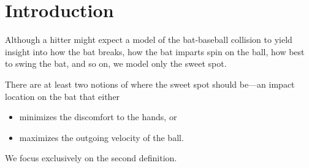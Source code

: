 
\section{Introduction}

Although a hitter might expect a model of the bat-baseball collision to
yield insight into how the bat breaks, how the bat imparts spin on the ball,
how best to swing the bat, and so on, we model only the sweet spot.

There are at least two notions of where the sweet spot should be—an
impact location on the bat that either
\begin{itemize}
\item minimizes the discomfort to the hands, or
\item maximizes the outgoing velocity of the ball.
\end{itemize}
We focus exclusively on the second definition.

